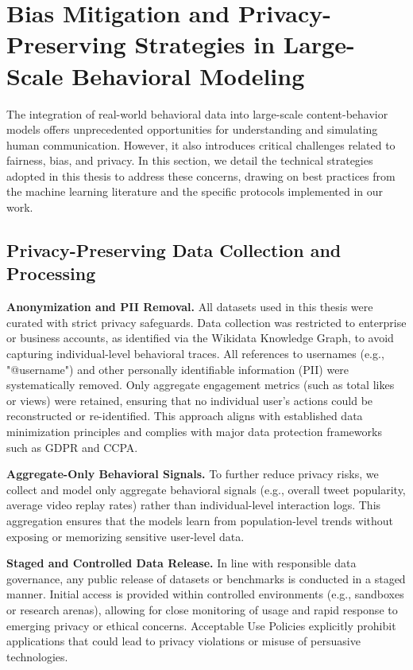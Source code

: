 \section{Bias Mitigation and Privacy-Preserving Strategies in Large-Scale Behavioral Modeling}
\label{sec:bias-privacy-appendix}
The integration of real-world behavioral data into large-scale content-behavior models offers unprecedented opportunities for understanding and simulating human communication. However, it also introduces critical challenges related to fairness, bias, and privacy. In this section, we detail the technical strategies adopted in this thesis to address these concerns, drawing on best practices from the machine learning literature and the specific protocols implemented in our work.

\subsection{Privacy-Preserving Data Collection and Processing}

\textbf{Anonymization and PII Removal.}
All datasets used in this thesis were curated with strict privacy safeguards. Data collection was restricted to enterprise or business accounts, as identified via the Wikidata Knowledge Graph, to avoid capturing individual-level behavioral traces. All references to usernames (e.g., "@username") and other personally identifiable information (PII) were systematically removed. Only aggregate engagement metrics (such as total likes or views) were retained, ensuring that no individual user’s actions could be reconstructed or re-identified. This approach aligns with established data minimization principles and complies with major data protection frameworks such as GDPR and CCPA.

\textbf{Aggregate-Only Behavioral Signals.}
To further reduce privacy risks, we collect and model only aggregate behavioral signals (e.g., overall tweet popularity, average video replay rates) rather than individual-level interaction logs. This aggregation ensures that the models learn from population-level trends without exposing or memorizing sensitive user-level data.


\textbf{Staged and Controlled Data Release.}
In line with responsible data governance, any public release of datasets or benchmarks is conducted in a staged manner. Initial access is provided within controlled environments (e.g., sandboxes or research arenas), allowing for close monitoring of usage and rapid response to emerging privacy or ethical concerns. Acceptable Use Policies explicitly prohibit applications that could lead to privacy violations or misuse of persuasive technologies.


